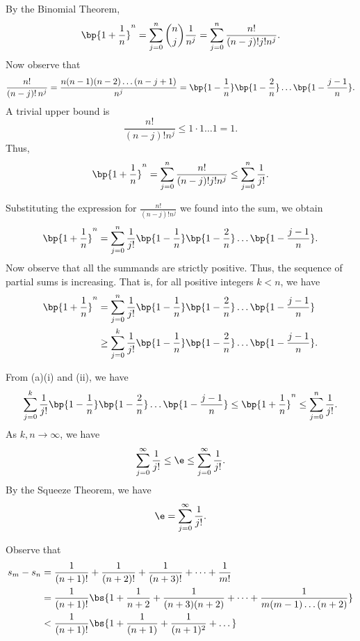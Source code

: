 \begin{solution}
    \begin{ppart}
        \begin{psubpart}
            By the Binomial Theorem, \[\bp{1 + \frac1n}^n = \sum_{j = 0}^n \binom{n}{j} \frac1{n^j} = \sum_{j = 0}^n \frac{n!}{(n-j)! j! n^j}.\] Now observe that \[\frac{n!}{(n-j)! \, n^j} = \frac{n(n-1)(n-2)\dots(n-j+1)}{n^j} = \bp{1 - \frac1n}\bp{1 - \frac2n}\dots\bp{1 - \frac{j-1}{n}}.\] A trivial upper bound is \[\frac{n!}{(n-j)! n^j} \leq 1 \cdot 1 \dots 1 = 1.\] Thus, \[\bp{1 + \frac1n}^n = \sum_{j = 0}^n \frac{n!}{(n-j)! j! n^j} \leq \sum_{j = 0}^n \frac{1}{j!}.\]
        \end{psubpart}
        \begin{psubpart}
            Substituting the expression for $\frac{n!}{(n-j)! n^j}$ we found into the sum, we obtain \[\bp{1 + \frac1n}^n = \sum_{j = 0}^n \frac1{j!} \bp{1 - \frac1n}\bp{1 - \frac2n}\dots\bp{1 - \frac{j-1}{n}}.\] Now observe that all the summands are strictly positive. Thus, the sequence of partial sums is increasing. That is, for all positive integers $k < n$, we have
            \begin{align*}
                \bp{1 + \frac1n}^n &= \sum_{j = 0}^n \frac1{j!} \bp{1 - \frac1n}\bp{1 - \frac2n}\dots\bp{1 - \frac{j-1}{n}}\\
                &\geq \sum_{j = 0}^k \frac1{j!} \bp{1 - \frac1n}\bp{1 - \frac2n}\dots\bp{1 - \frac{j-1}{n}}.
            \end{align*}
        \end{psubpart}
    \end{ppart}
    \begin{ppart}
        From (a)(i) and (ii), we have \[\sum_{j = 0}^k \frac1{j!} \bp{1 - \frac1n}\bp{1 - \frac2n}\dots\bp{1 - \frac{j-1}{n}} \leq \bp{1 + \frac1n}^n \leq \sum_{j = 0}^n \frac{1}{j!}.\] As $k, n \to \infty$, we have \[\sum_{j = 0}^\infty \frac1{j!} \leq \e \leq \sum_{j = 0}^\infty \frac{1}{j!}.\] By the Squeeze Theorem, we have \[\e = \sum_{j = 0}^\infty \frac{1}{j!}.\]
    \end{ppart}
    \begin{ppart}
        Observe that
        \begin{align*}
            s_m - s_n &= \frac1{(n+1)!} + \frac1{(n+2)!} + \frac1{(n+3)!} + \dots + \frac1{m!}\\
            &= \frac1{(n+1)!} \bs{1 + \frac1{n+2} + \frac1{(n+3)(n+2)} + \dots + \frac1{m(m-1)\dots(n+2)}}\\
            &< \frac1{(n+1)!} \bs{1 + \frac1{(n+1)} + \frac1{(n+1)^2} + \dots}\\

\end{align*}
\end{ppart}
\end{solution}
